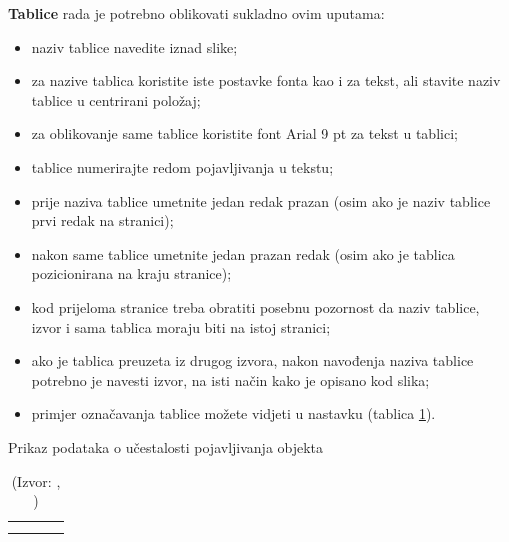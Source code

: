 \documentclass{foi}
\begin{document}
\begin{flushleft}\textbf{Tablice} rada je potrebno oblikovati sukladno ovim uputama:\end{flushleft}
\begin{itemize}
    \item naziv tablice navedite iznad slike;

    \item za nazive tablica koristite iste postavke fonta kao i za tekst, ali stavite naziv tablice u centrirani položaj;

    \item za oblikovanje same tablice koristite font Arial 9 pt za tekst u tablici;

    \item tablice numerirajte redom pojavljivanja u tekstu;

    \item prije naziva tablice umetnite jedan redak prazan (osim ako je naziv tablice prvi redak na stranici);

    \item nakon same tablice umetnite jedan prazan redak (osim ako je tablica pozicionirana na kraju stranice);

    \item kod prijeloma stranice treba obratiti posebnu pozornost da naziv tablice, izvor i sama tablica moraju biti na istoj stranici; 

    \item ako je tablica preuzeta iz drugog izvora, nakon navođenja naziva tablice potrebno je navesti izvor, na isti način kako je opisano kod slika;

    \item primjer označavanja tablice možete vidjeti u nastavku (tablica \ref{tab:objekti}).
\end{itemize}

\begin{table}[h!] 
    \centering
    \caption{Prikaz podataka o učestalosti pojavljivanja objekta}
    \begin{tabularx}{0.66\textwidth}{|X|X|X|X|}
        \hline
         \cellcolor{gray!25} & \cellcolor{gray!25} & \cellcolor{gray!25} & \cellcolor{gray!25} \\
        \hline
         &  &  &  \\
        \hline
         &  &  & \\
        \hline
    \end{tabularx}
    \\[10pt]
    \caption*{(Izvor: \citeauthor{caragliu2011smart}, \citeyear{caragliu2011smart})}
    \label{tab:objekti}
\end{table}
\end{document}
